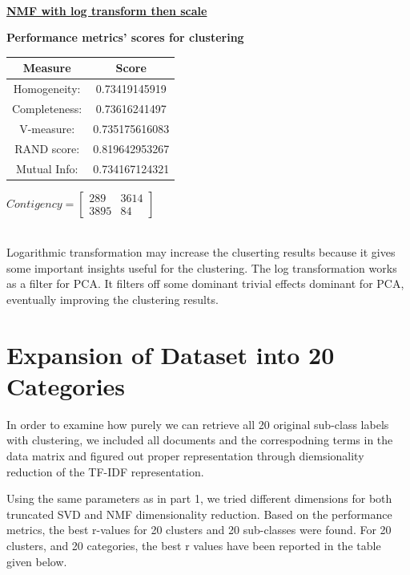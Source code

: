 \documentclass{article}
\begin{document}
\\ \vspace{20pt}

\underline{\textbf{NMF with log transform then scale}}

\begin{center}
	\textbf{Performance metrics' scores for clustering} \\ \vspace{5pt}
	\begin{tabular}{*{2}{c}}			
			\toprule
			\textbf{Measure} & \textbf{Score} \\
			\midrule			
			Homogeneity: & 0.73419145919 \\
			\midrule
			Completeness: & 0.73616241497 \\
			\midrule
			V-measure: & 0.735175616083 \\
			\midrule
			RAND score: & 0.819642953267 \\
			\midrule
			Mutual Info: & 0.734167124321 \\
			\bottomrule
	\end{tabular}
	\qquad
	$Contigency = \left[\begin{array}{*{2}{c}}
		 289 & 3614 \\
	 	 3895 & 84    
		    \end{array}\right]
    $
\end{center}

\\ \vspace{20pt}
Logarithmic transformation may increase the cluserting results because it gives some important insights useful for the clustering. The log transformation works as a filter for PCA. It filters off some dominant trivial effects dominant for PCA, eventually improving the clustering results. \\ 


\section{Expansion of Dataset into 20 Categories}
In order to examine how purely we can retrieve all 20 original sub-class labels with clustering, we included all documents and the correspodning terms in the data matrix and figured out proper representation through diemsionality reduction of the TF-IDF representation.

Using the same parameters as in part 1, we tried different dimensions for both truncated SVD and NMF dimensionality reduction. Based on the performance metrics, the best r-values for 20 clusters and 20 sub-classes were found. For 20 clusters, and 20 categories, the best r values have been reported in the table given below. \\
\end{document}
